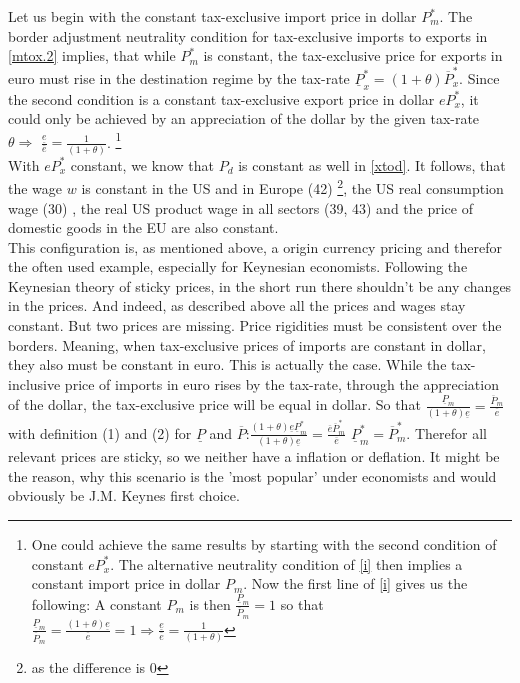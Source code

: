 Let us begin with the constant tax-exclusive import price in dollar $P_m^*$. The border adjustment neutrality condition for tax-exclusive imports to exports in \eqref{mtox.2} implies, that while $P_m^*$ is constant, the tax-exclusive price for exports in euro must rise in the destination regime by the tax-rate $ \underline P^*_x = (1+\theta) \overline P^*_x$. Since the second condition is a constant tax-exclusive export price in dollar $e  P^*_x$, it could only be achieved by an appreciation of the dollar by the given tax-rate $\theta \Rightarrow$ $\frac{\underline e}{\overline e} = \frac{1}{(1+\theta)}$. \footnote{One could achieve the same results by starting with the second condition of constant $e  P^*_x$. The alternative neutrality condition of \eqref{i} then implies a constant import price in dollar $P_m$. Now the first line of \eqref{i} gives us the following: A constant $P_m$ is then $\frac{\underline P_m}{\overline P_m} = 1$ so that  $\frac{\underline P_m}{\overline P_m} = \frac{(1+\theta)\underline e}{\overline e} = 1 \Rightarrow \frac{\underline e}{\overline e} = \frac{1}{(1+\theta)}$}
\\
With $eP^*_x$ constant, we know that $P_d$ is constant as well in \eqref{xtod}. It follows, that the wage $w$ is constant in the US and in Europe (42) \footnote{as the difference is 0}, the US real consumption wage (30) , the real US product wage in all sectors (39, 43) and the price of domestic goods in the EU are also constant. \\
This configuration is, as mentioned above, a origin currency pricing and therefor the often used example, especially for Keynesian economists. Following the Keynesian theory of sticky prices, in the short run there shouldn't be any changes in the prices. And indeed, as described above all the prices and wages stay constant. But two prices are missing. Price rigidities must be consistent over the borders. Meaning, when tax-exclusive prices of imports are constant in dollar, they also must be constant in euro. This is actually the case. While the tax-inclusive price of imports in euro rises by the tax-rate, through the appreciation of the dollar, the tax-exclusive price will be equal in dollar. So that $\frac{\underline P_m}{(1+\theta)\underline e} = \frac{\overline P_m}{\overline e}$ with definition (1) and (2) for $\underline P$ and $\overline P$:\newline $\frac{(1+\theta)\underline e \underline P_m^*}{(1+\theta)\underline e} = \frac{\overline e \overline P_m^*}{\overline e}$ \Rightarrow \quad $\underline P_m^* = \overline P_m^*$. Therefor all relevant prices are sticky, so we neither have a inflation or deflation. It might be the reason, why this scenario is the 'most popular' under economists and would obviously be J.M. Keynes first choice. 


